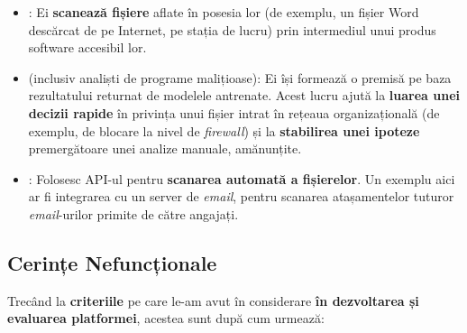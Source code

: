 \documentclass[../../main.tex]{subfiles}
\begin{document}
\begin{itemize}
    \item {}: Ei \textbf{scanează fișiere} aflate în posesia lor (de exemplu, un fișier Word descărcat de pe Internet, pe stația de lucru) prin intermediul unui produs software accesibil lor.
    \item {} (inclusiv analiști de programe malițioase): Ei își formează o premisă pe baza rezultatului returnat de modelele antrenate. Acest lucru ajută la \textbf{luarea unei decizii rapide} în privința unui fișier intrat în rețeaua organizațională (de exemplu, de blocare la nivel de \textit{firewall}) și la \textbf{stabilirea unei ipoteze} premergătoare unei analize manuale, amănunțite.
    \item {}: Folosesc API-ul pentru \textbf{scanarea a\-utomată a fișierelor}. Un exemplu aici ar fi integrarea cu un server de \textit{email}, pentru scanarea atașamentelor tuturor \textit{email}-urilor primite de către angajați.
\end{itemize}

\subsection{Cerințe Nefuncționale}

Trecând la \textbf{criteriile} pe care le-am avut în considerare \textbf{în dezvoltarea și evaluarea platformei}, acestea sunt după cum urmează:
\end{document}
